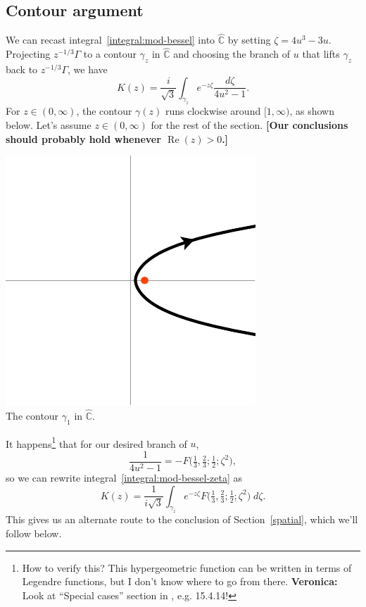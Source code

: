 \documentclass{article}
\newcommand{\C}{\mathbb{C}}
\begin{document}
\subsection{Contour argument}
We can recast integral~\ref{integral:mod-bessel} into $\hat{\C}$ by setting $\zeta = 4u^3 - 3u$. Projecting $z^{-1/3} \Gamma$ to a contour $\gamma_z$ in $\hat{\C}$ and choosing the branch of $u$ that lifts $\gamma_z$ back to $z^{-1/3} \Gamma$, we have
\begin{equation}\label{integral:mod-bessel-zeta}
K(z) = \frac{i}{\sqrt{3}} \int_{\gamma_z} e^{-z\zeta}\frac{d\zeta}{4u^2 - 1}.
\end{equation}
For $z \in (0, \infty)$, the contour $\gamma(z)$ runs clockwise around $[1, \infty)$, as shown below. Let's assume $z \in (0, \infty)$ for the rest of the section. \textbf{[Our conclusions should probably hold whenever $\operatorname{Re}(z) > 0$.]}
\begin{center}
\includegraphics{figures/zeta_contour.pdf} \\[1em]
{\small The contour $\gamma_1$ in $\hat{\C}$.}
\end{center}

It happens\footnote{How to verify this? This hypergeometric function can be written in terms of Legendre functions, but I don't know where to go from there. \textbf{Veronica:} Look at ``Special cases'' section in \cite{dlmf}, e.g. 15.4.14!} that for our desired branch of $u$,
\[ \frac{1}{4u^2 - 1} = -F\big(\tfrac{1}{3}, \tfrac{2}{3}; \tfrac{1}{2}; \zeta^2\big), \]
so we can rewrite integral~\ref{integral:mod-bessel-zeta} as
\[ K(z) = \frac{1}{i\sqrt{3}} \int_{\gamma_z} e^{-z\zeta} F\big(\tfrac{1}{3}, \tfrac{2}{3}; \tfrac{1}{2}; \zeta^2\big)\;d\zeta. \]
This gives us an alternate route to the conclusion of Section~\ref{spatial}, which we'll follow below.
\end{document}
